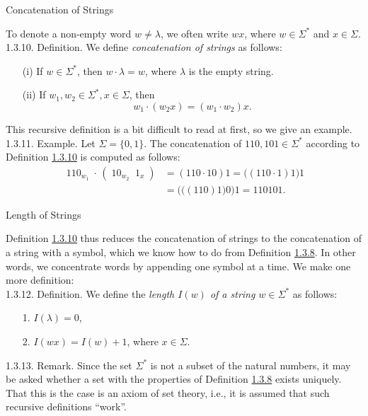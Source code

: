 \documentclass[smaller,hyperref={CJKbookmarks=true}]{beamer}
\begin{document}
\begin{frame}[t,label=Concatenation]{Concatenation of Strings}
\begin{spacing}{1.05}
To denote a non-empty word $w\neq\lambda$, we often write $wx$, where $w\in\Sigma^*$ and $x\in\Sigma$.\\[5pt]
\alert{1.3.10. Definition.} We define \emph{concatenation of strings} as follows:
\begin{itemize}
  \item[(i)] If $w\in\Sigma^*$, then $w\cdot\lambda=w$, where $\lambda$ is the empty string.
  \item[(ii)] If $w_1,w_2\in\Sigma^*,x\in\Sigma$, then
      \[w_1\cdot(w_2x)=(w_1\cdot w_2)x.\]
\end{itemize}
\vspace*{4pt}
This recursive definition is a bit difficult to read at first, so we give an
example.\\[5pt]
\alert{1.3.11. Example.} Let $\Sigma=\{0,1\}$. The concatenation of $110,101\in\Sigma^*$ according to Definition \hyperlink{Concatenation}{1.3.10} is computed as follows:
\begin{equation*}
  \begin{split}
     \mathop{110}_{w_1}\cdot\,(\mathop{10}_{w_2}\mathop{1}_{x}) &=(110\cdot10)1=\big((110\cdot1)1\big)1 \\
       &=\big(\big((110)1\big)0\big)1=110101.
  \end{split}
\end{equation*}
\end{spacing}
\end{frame}
\begin{frame}[c,label=1.3.12]{Length of Strings}
\begin{spacing}{1.1}
Definition \hyperlink{Concatenation}{1.3.10} thus reduces the concatenation of strings to the concatenation of a string with a symbol, which we know how to do from Definition \hyperlink{1.3.8}{1.3.8}. In other words, we concentrate words by appending one symbol at a time. We make one more definition:\\[5pt]
\alert{1.3.12. Definition.} We define the \emph{length $I(w)$ of a string $w\in\Sigma^*$} as follows:
\begin{itemize}
  \item[1.] $I(\lambda)=0$,
  \item[2.] $I(wx)=I(w)+1$, where $x\in\Sigma$.
\end{itemize}
\vspace*{6pt}
\alert{1.3.13. Remark.} Since the set $\Sigma^*$ is not a subset of the natural numbers, it
may be asked whether a set with the properties of Definition \hyperlink{1.3.8}{1.3.8} exists uniquely. That this is the case is an axiom of set theory, i.e., it is assumed
that such recursive definitions ``work''.
\end{spacing}
\end{frame}
\end{document}
